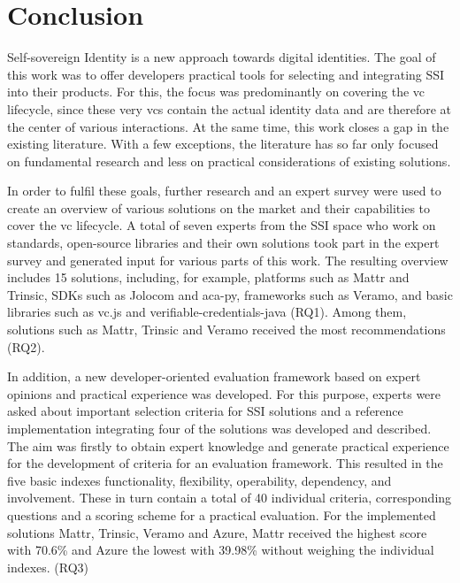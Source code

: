 \chapter{Conclusion}


Self-sovereign Identity is a new approach towards digital identities. The goal of this work was to offer developers practical tools for selecting and integrating \ac{SSI} into their products. For this, the focus was predominantly on covering the \ac{vc} lifecycle, since these very \acp{vc} contain the actual identity data and are therefore at the center of various interactions. At the same time, this work closes a gap in the existing literature. With a few exceptions, the literature has so far only focused on fundamental research and less on practical considerations of existing solutions.

In order to fulfil these goals, further research and an expert survey were used to create an overview of various solutions on the market and their capabilities to cover the \ac{vc} lifecycle. A total of seven experts from the \ac{SSI} space who work on standards, open-source libraries and their own solutions took part in the expert survey and generated input for various parts of this work. The resulting overview includes 15 solutions, including, for example, platforms such as Mattr and Trinsic, SDKs such as Jolocom and aca-py, frameworks such as Veramo, and basic libraries such as vc.js and verifiable-credentials-java (RQ1). Among them, solutions such as Mattr, Trinsic and Veramo received the most recommendations (RQ2).

In addition, a new developer-oriented evaluation framework based on expert opinions and practical experience was developed. For this purpose, experts were asked about important selection criteria for \ac{SSI} solutions and a reference implementation integrating four of the solutions was developed and described. The aim was firstly to obtain expert knowledge and generate practical experience for the development of criteria for an evaluation framework. This resulted in the five basic indexes functionality, flexibility, operability, dependency, and involvement. These in turn contain a total of 40 individual criteria, corresponding questions and a scoring scheme for a practical evaluation. For the implemented solutions Mattr, Trinsic, Veramo and Azure, Mattr received the highest score with 70.6\% and Azure the lowest with 39.98\% without weighing the individual indexes. (RQ3)

